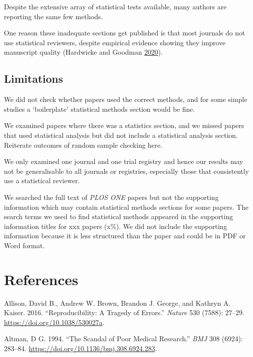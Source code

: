 \documentclass[
]{article}
\begin{document}
Despite the extensive array of statistical tests available, many authors
are reporting the same few methods.

One reason these inadequate sections get published is that most journals
do not use statistical reviewers, despite empirical evidence showing
they improve manuscript quality (Hardwicke and Goodman
\protect\hyperlink{ref-Hardwicke2020}{2020}).

\hypertarget{limitations}{%
\subsection{Limitations}\label{limitations}}

We did not check whether papers used the correct methods, and for some
simple studies a `boilerplate' statistical methods section would be
fine.

We examined papers where there was a statistics section, and we missed
papers that used statistical analysis but did not include a statistical
analysis section. Reiterate outcomes of random sample checking here.

We only examined one journal and one trial registry and hence our
results may not be generalisable to all journals or registries,
especially those that consistently use a statistical reviewer.

We searched the full text of \emph{PLOS ONE} papers but not the
supporting information which may contain statistical methods sections
for some papers. The search terms we used to find statistical methods
appeared in the supporting information titles for xxx papers (x\%). We
did not include the supporting information because it is less structured
than the paper and could be in PDF or Word format.

\hypertarget{references}{%
\section*{References}\label{references}}

\hypertarget{refs}{}
\leavevmode\hypertarget{ref-Allison2016}{}%
Allison, David B., Andrew W. Brown, Brandon J. George, and Kathryn A.
Kaiser. 2016. ``Reproducibility: A Tragedy of Errors.'' \emph{Nature}
530 (7588): 27--29. \url{https://doi.org/10.1038/530027a}.

\leavevmode\hypertarget{ref-Altman1994}{}%
Altman, D G. 1994. ``The Scandal of Poor Medical Research.'' \emph{BMJ}
308 (6924): 283--84. \url{https://doi.org/10.1136/bmj.308.6924.283}.
\end{document}

